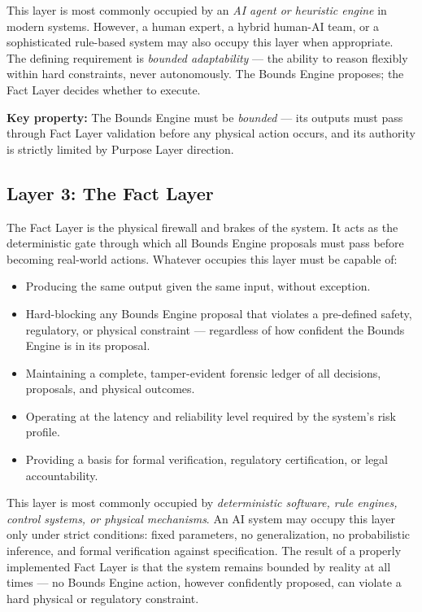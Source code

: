 \documentclass[12pt]{article}
\theoremstyle{plain}
\begin{document}
This layer is most commonly occupied by an \textit{AI agent or heuristic engine} in modern systems. However, a human expert, a hybrid human-AI team, or a sophisticated rule-based system may also occupy this layer when appropriate. The defining requirement is \textit{bounded adaptability} --- the ability to reason flexibly within hard constraints, never autonomously. The Bounds Engine proposes; the Fact Layer decides whether to execute.

\textbf{Key property:} The Bounds Engine must be \textit{bounded} --- its outputs must pass through Fact Layer validation before any physical action occurs, and its authority is strictly limited by Purpose Layer direction.

\subsection{Layer 3: The Fact Layer}

The Fact Layer is the physical firewall and brakes of the system. It acts as the deterministic gate through which all Bounds Engine proposals must pass before becoming real-world actions. Whatever occupies this layer must be capable of:

\begin{itemize}[noitemsep]
    \item Producing the same output given the same input, without exception.
    \item Hard-blocking any Bounds Engine proposal that violates a pre-defined safety, regulatory, or physical constraint --- regardless of how confident the Bounds Engine is in its proposal.
    \item Maintaining a complete, tamper-evident forensic ledger of all decisions, proposals, and physical outcomes.
    \item Operating at the latency and reliability level required by the system's risk profile.
    \item Providing a basis for formal verification, regulatory certification, or legal accountability.
\end{itemize}

This layer is most commonly occupied by \textit{deterministic software, rule engines, control systems, or physical mechanisms}. An AI system may occupy this layer only under strict conditions: fixed parameters, no generalization, no probabilistic inference, and formal verification against specification. The result of a properly implemented Fact Layer is that the system remains bounded by reality at all times --- no Bounds Engine action, however confidently proposed, can violate a hard physical or regulatory constraint.
\end{document}
